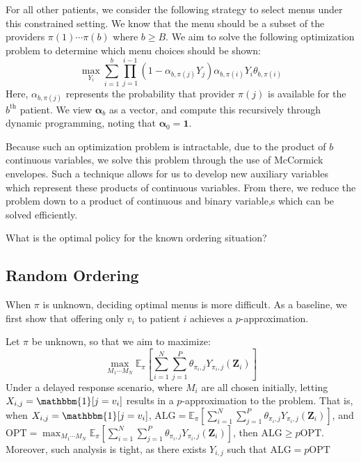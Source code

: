 For all other patients, we consider the following strategy to select menus under this constrained setting. 
We know that the menu should be a subset of the providers $\pi(1) \cdots \pi(b)$ where $b \geq B$. 
We aim to solve the following optimization problem to determine which menu choices should be shown: 
\begin{equation}
    \max\limits_{Y_{i}} \sum_{i=1}^{b} \prod_{j=1}^{i-1} (1-\alpha_{b,\pi(j)}Y_{j}) \alpha_{b,\pi(i)} Y_{i} \theta_{b,\pi(i)}
\end{equation}
Here, $\alpha_{b,\pi(j)}$ represents the probability that provider $\pi(j)$ is available for the $b^{\mathrm{th}}$ patient. 
We view $\mathbf{\alpha}_{b}$ as a vector, and compute this recursively through dynamic programming, noting that $\mathbf{\alpha}_{0} = \mathbf{1}$. 

Because such an optimization problem is intractable, due to the product of $b$ continuous variables, we solve this problem through the use of McCormick envelopes. 
Such a technique allows for us to develop new auxiliary variables which represent these products of continuous variables. 
From there, we reduce the problem down to a product of continuous and binary variable,s which can be solved efficiently. 

\begin{question}
    What is the optimal policy for the known ordering situation? 
\end{question}

\subsection{Random Ordering}
When $\pi$ is unknown, deciding optimal menus is more difficult. 
As a baseline, we first show that offering only $v_{i}$ to patient $i$ achieves a $p$-approximation. 
\begin{lemma}
    Let $\pi$ be unknown, so that we aim to maximize: 
    \begin{equation}
        \max_{M_{1} \cdots M_{N}} \mathbb{E}_{\pi}[\sum_{i=1}^{N} \sum_{j=1}^{P} \theta_{\pi_{i},j} Y_{\pi_{i},j}(\mathbf{Z}_{i})]
    \end{equation}
    Under a delayed response scenario, where $M_{i}$ are all chosen initially, letting $X_{i,j} = \mathbbm{1}[j = v_{i}]$ results in a $p$-approximation to the problem. 
    That is, when $X_{i,j} = \mathbbm{1}[j = v_{i}]$, $\mathrm{ALG} = \mathbb{E}_{\pi}[\sum_{i=1}^{N} \sum_{j=1}^{P} \theta_{\pi_{i},j} Y_{\pi_{i},j}(\mathbf{Z}_{i})]$, and $\mathrm{OPT} = \max_{M_{1} \cdots M_{N}} \mathbb{E}_{\pi}[\sum_{i=1}^{N} \sum_{j=1}^{P} \theta_{\pi_{i},j} Y_{\pi_{i},j}(\mathbf{Z}_{i})]$, then $\mathrm{ALG} \geq p \mathrm{OPT}$. 
    Moreover, such analysis is tight, as there exists $Y_{i,j}$ such that $\mathrm{ALG} = p \mathrm{OPT}$
\end{lemma}

